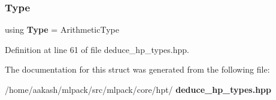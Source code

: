 \subsubsection{Type}
{\footnotesize\ttfamily using \textbf{ Type} =  Arithmetic\+Type}



Definition at line 61 of file deduce\+\_\+hp\+\_\+types.\+hpp.



The documentation for this struct was generated from the following file\+:\begin{DoxyCompactItemize}
\item 
/home/aakash/mlpack/src/mlpack/core/hpt/\textbf{ deduce\+\_\+hp\+\_\+types.\+hpp}\end{DoxyCompactItemize}
